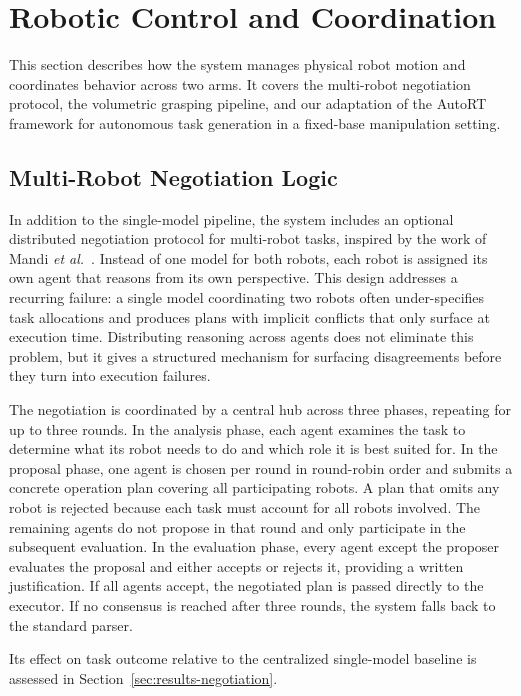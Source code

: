 \documentclass[
     12pt,
     a4paper,
     BCOR=10mm,
     DIV=14,
     listof=totoc,
     bibliography=totoc,
     parskip,
     twoside,
     headsepline
     ]{scrreprt}
\begin{document}
\section{Robotic Control and Coordination}
This section describes how the system manages physical robot motion and coordinates behavior across two arms. It covers the multi-robot negotiation protocol, the volumetric grasping pipeline, and our adaptation of the AutoRT framework for autonomous task generation in a fixed-base manipulation setting.

\subsection{Multi-Robot Negotiation Logic}\label{sec:negotiation}
In addition to the single-model pipeline, the system includes an optional distributed negotiation protocol for multi-robot tasks, inspired by the work of Mandi \emph{et al.}~\cite{mandi2023rocodialecticmultirobotcollaboration}. Instead of one model for both robots, each robot is assigned its own agent that reasons from its own perspective. This design addresses a recurring failure: a single model coordinating two robots often under-specifies task allocations and produces plans with implicit conflicts that only surface at execution time. Distributing reasoning across agents does not eliminate this problem, but it gives a structured mechanism for surfacing disagreements before they turn into execution failures.

The negotiation is coordinated by a central hub across three phases, repeating for up to three rounds. In the analysis phase, each agent examines the task to determine what its robot needs to do and which role it is best suited for. In the proposal phase, one agent is chosen per round in round-robin order and submits a concrete operation plan covering all participating robots. A plan that omits any robot is rejected because each task must account for all robots involved. The remaining agents do not propose in that round and only participate in the subsequent evaluation. In the evaluation phase, every agent except the proposer evaluates the proposal and either accepts or rejects it, providing a written justification. If all agents accept, the negotiated plan is passed directly to the executor. If no consensus is reached after three rounds, the system falls back to the standard parser.

Its effect on task outcome relative to the centralized single-model baseline is assessed in Section~\ref{sec:results-negotiation}.
\end{document}
